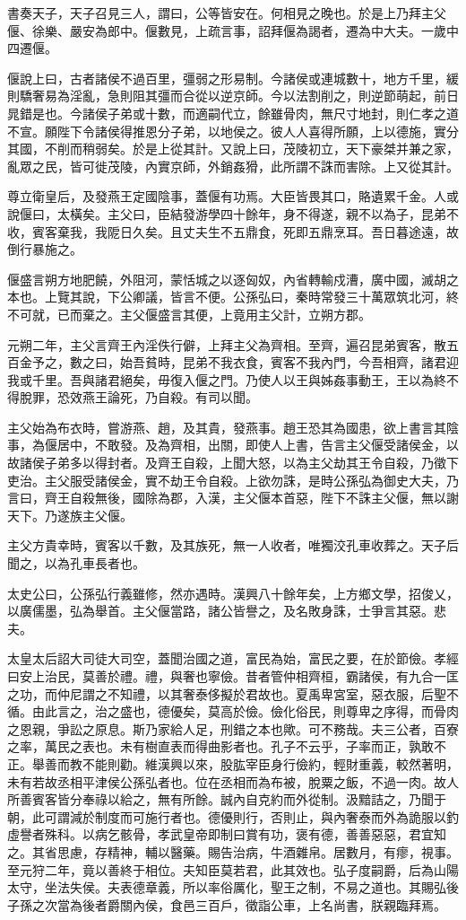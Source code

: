 書奏天子，天子召見三人，謂曰，公等皆安在。何相見之晚也。於是上乃拜主父偃、徐樂、嚴安為郎中。偃數見，上疏言事，詔拜偃為謁者，遷為中大夫。一歲中四遷偃。

偃說上曰，古者諸侯不過百里，彊弱之形易制。今諸侯或連城數十，地方千里，緩則驕奢易為淫亂，急則阻其彊而合從以逆京師。今以法割削之，則逆節萌起，前日晁錯是也。今諸侯子弟或十數，而適嗣代立，餘雖骨肉，無尺寸地封，則仁孝之道不宣。願陛下令諸侯得推恩分子弟，以地侯之。彼人人喜得所願，上以德施，實分其國，不削而稍弱矣。於是上從其計。又說上曰，茂陵初立，天下豪桀并兼之家，亂眾之民，皆可徙茂陵，內實京師，外銷姦猾，此所謂不誅而害除。上又從其計。

尊立衛皇后，及發燕王定國陰事，蓋偃有功焉。大臣皆畏其口，賂遺累千金。人或說偃曰，太橫矣。主父曰，臣結發游學四十餘年，身不得遂，親不以為子，昆弟不收，賓客棄我，我阸日久矣。且丈夫生不五鼎食，死即五鼎烹耳。吾日暮途遠，故倒行暴施之。

偃盛言朔方地肥饒，外阻河，蒙恬城之以逐匈奴，內省轉輸戍漕，廣中國，滅胡之本也。上覽其說，下公卿議，皆言不便。公孫弘曰，秦時常發三十萬眾筑北河，終不可就，已而棄之。主父偃盛言其便，上竟用主父計，立朔方郡。

元朔二年，主父言齊王內淫佚行僻，上拜主父為齊相。至齊，遍召昆弟賓客，散五百金予之，數之曰，始吾貧時，昆弟不我衣食，賓客不我內門，今吾相齊，諸君迎我或千里。吾與諸君絕矣，毋復入偃之門。乃使人以王與姊姦事動王，王以為終不得脫罪，恐效燕王論死，乃自殺。有司以聞。

主父始為布衣時，嘗游燕、趙，及其貴，發燕事。趙王恐其為國患，欲上書言其陰事，為偃居中，不敢發。及為齊相，出關，即使人上書，告言主父偃受諸侯金，以故諸侯子弟多以得封者。及齊王自殺，上聞大怒，以為主父劫其王令自殺，乃徵下吏治。主父服受諸侯金，實不劫王令自殺。上欲勿誅，是時公孫弘為御史大夫，乃言曰，齊王自殺無後，國除為郡，入漢，主父偃本首惡，陛下不誅主父偃，無以謝天下。乃遂族主父偃。

主父方貴幸時，賓客以千數，及其族死，無一人收者，唯獨洨孔車收葬之。天子后聞之，以為孔車長者也。

太史公曰，公孫弘行義雖修，然亦遇時。漢興八十餘年矣，上方鄉文學，招俊乂，以廣儒墨，弘為舉首。主父偃當路，諸公皆譽之，及名敗身誅，士爭言其惡。悲夫。

太皇太后詔大司徒大司空，蓋聞治國之道，富民為始，富民之要，在於節儉。孝經曰安上治民，莫善於禮。禮，與奢也寧儉。昔者管仲相齊桓，霸諸侯，有九合一匡之功，而仲尼謂之不知禮，以其奢泰侈擬於君故也。夏禹卑宮室，惡衣服，后聖不循。由此言之，治之盛也，德優矣，莫高於儉。儉化俗民，則尊卑之序得，而骨肉之恩親，爭訟之原息。斯乃家給人足，刑錯之本也歟。可不務哉。夫三公者，百寮之率，萬民之表也。未有樹直表而得曲影者也。孔子不云乎，子率而正，孰敢不正。舉善而教不能則勸。維漢興以來，股肱宰臣身行儉約，輕財重義，較然著明，未有若故丞相平津侯公孫弘者也。位在丞相而為布被，脫粟之飯，不過一肉。故人所善賓客皆分奉祿以給之，無有所餘。誠內自克約而外從制。汲黯詰之，乃聞于朝，此可謂減於制度而可施行者也。德優則行，否則止，與內奢泰而外為詭服以釣虛譽者殊科。以病乞骸骨，孝武皇帝即制曰賞有功，褒有德，善善惡惡，君宜知之。其省思慮，存精神，輔以醫藥。賜告治病，牛酒雜帛。居數月，有瘳，視事。至元狩二年，竟以善終于相位。夫知臣莫若君，此其效也。弘子度嗣爵，后為山陽太守，坐法失侯。夫表德章義，所以率俗厲化，聖王之制，不易之道也。其賜弘後子孫之次當為後者爵關內侯，食邑三百戶，徵詣公車，上名尚書，朕親臨拜焉。

